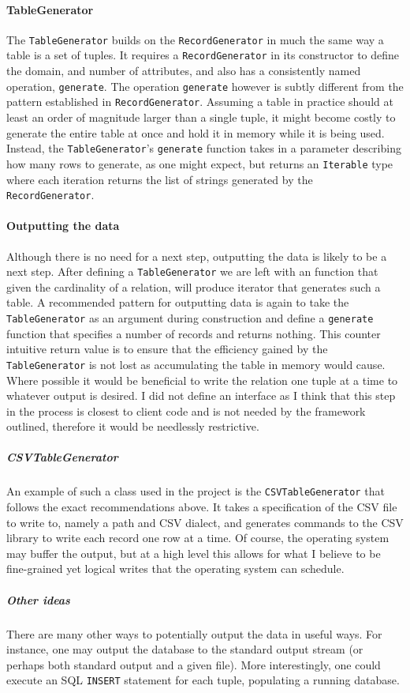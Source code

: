 \paragraph{TableGenerator} The \lstinline{TableGenerator} builds on the
\lstinline{RecordGenerator} in much the same way a table is a set of tuples. It
requires a \lstinline{RecordGenerator} in its constructor to define the domain,
and number of attributes, and also has a consistently named operation,
\lstinline{generate}. The operation \lstinline{generate} however is subtly
different from the pattern established in \lstinline{RecordGenerator}. Assuming
a table in practice should at least an order of magnitude larger than a single
tuple, it might become costly to generate the entire table at once and hold it
in memory while it is being used. Instead, the \lstinline{TableGenerator}'s
\lstinline{generate} function takes in a parameter describing how many rows to
generate, as one might expect, but returns an \lstinline{Iterable} type where
each iteration returns the list of strings generated by the
\lstinline{RecordGenerator}.

\paragraph{Outputting the data} Although there is no need for a next step,
outputting the data is likely to be a next step. After defining a
\lstinline{TableGenerator} we are left with an function that given the
cardinality of a relation, will produce iterator that generates such a table.
A recommended pattern for outputting data is again to take the
\lstinline{TableGenerator} as an argument during construction and define a
\lstinline{generate} function that specifies a number of records and returns
nothing. This counter intuitive return value is to ensure that the efficiency
gained by the \lstinline{TableGenerator} is not lost as accumulating the table
in memory would cause. Where possible it would be beneficial to write the relation one
tuple at a time to whatever output is desired. I did not define an interface as
I
think that this step in the process is closest to client code and is not needed
by the framework outlined, therefore it would be needlessly restrictive.

\subparagraph{CSVTableGenerator} An example of such a class used in the project
is the \lstinline{CSVTableGenerator} that follows the exact recommendations
above. It takes a specification of the CSV file to write to, namely a path and
CSV dialect, and generates commands to the CSV library to write each record one row
at a time. Of course, the operating system may buffer the output, but at a high
level this allows for what I believe to be fine-grained yet logical writes that the
operating system can schedule.

\subparagraph{Other ideas} There are many other ways to potentially output the
data in useful ways. For instance, one may output the database to the standard
output
stream (or perhaps both standard output and a given file). More interestingly, one could execute an SQL \lstinline{INSERT}
statement for each tuple, populating a running database.
